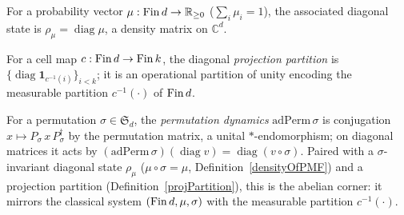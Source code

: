 \begin{definition}\label{densityOfPMF}
  \leanok
  For a probability vector \(\mu:\operatorname{Fin} d\to\mathbb{R}_{\ge 0}\) (\(\sum_i\mu_i=1\)), the associated diagonal
  state is \(\rho_\mu=\operatorname{diag}\mu\), a density matrix on \(\mathbb{C}^d\).
\end{definition}

\begin{definition}\label{projPartition}
  \leanok
  For a cell map \(c:\operatorname{Fin} d\to\operatorname{Fin} k\), the diagonal \emph{projection partition} is
  \(\{\operatorname{diag}\mathbf 1_{c^{-1}(i)}\}_{i<k}\); it is an operational partition of unity
  encoding the measurable partition \(c^{-1}(\cdot)\) of \(\operatorname{Fin} d\).
\end{definition}

\begin{definition}\label{adPerm}
  \leanok
  For a permutation \(\sigma\in\mathfrak{S}_d\), the \emph{permutation dynamics}
  \(\mathrm{adPerm}\,\sigma\) is conjugation \(x\mapsto P_\sigma\,x\,P_\sigma^{\dagger}\) by the
  permutation matrix, a unital \(*\)-endomorphism; on diagonal matrices it acts by
  \((\mathrm{adPerm}\,\sigma)(\operatorname{diag}v)=\operatorname{diag}(v\circ\sigma)\). Paired with a
  \(\sigma\)-invariant diagonal state \(\rho_\mu\) (\(\mu\circ\sigma=\mu\),
  Definition~\ref{densityOfPMF}) and a projection partition (Definition~\ref{projPartition}), this is
  the abelian corner: it mirrors the classical system \((\operatorname{Fin} d,\mu,\sigma)\) with the measurable
  partition \(c^{-1}(\cdot)\).
\end{definition}

